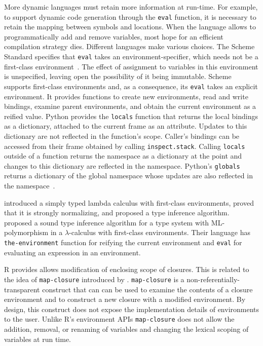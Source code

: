 \documentclass[10pt,review,sigplan,authorversion=true]{acmart}
\newcommand{\code}[1]{\lstinline |#1|\xspace}
\renewcommand{\c}[1]{\lstinline |#1|\xspace}
\begin{document}
More dynamic languages must retain more information at run-time. For example, to
support dynamic code generation through the \c{eval} function, it is necessary
to retain the mapping between symbols and locations. When the language allows to
programmatically add and remove variables, most hope for an efficient
compilation strategy dies. Different languages make various choices. The Scheme
Standard specifies that \code{eval} takes an environment-specifier, which needs
not be a first-class environment~\cite{SchemeR5RS}. The effect of assignment to
variables in this environment is unspecified, leaving open the possibility of it
being immutable. Scheme supports first-class environments and, as a consequence,
its \code{eval} takes an explicit environment. It provides functions to create
new environments, read and write bindings, examine parent environments, and
obtain the current environment as a reified value. Python provides the
\code{locals} function that returns the local bindings as a dictionary, attached
to the current frame as an attribute. Updates to this dictionary are not
reflected in the function's scope. Caller's bindings can be accessed from their
frame obtained by calling \code{inspect.stack}. Calling \code{locals} outside of
a function returns the namespace as a dictionary at the point and changes to
this dictionary are reflected in the namespace. Python's \code{globals} returns
a dictionary of the global namespace whose updates are also reflected in the
namespace~\cite{}.

\citet{NishizakiSTLC94} introduced a simply typed lambda calculus with
first-class environments, proved that it is strongly normalizing, and proposed a
type inference algorithm. \citet{NishizakiML94} proposed a sound type inference
algorithm for a type system with ML-polymorphism in a $\lambda$-calculus with
first-class environments. Their language has \c{the-environment} function for
reifying the current environment and \c{eval} for evaluating an expression in an
environment.

R provides allows modification of enclosing scope of closures. This is related
to the idea of \c{map-closure} introduced by \citet{Siskind07}. \c{map-closure}
is a non-referentially-transparent construct that can can be used to examine the
contents of a closure environment and to construct a new closure with a modified
environment. By design, this construct does not expose the implementation
details of environments to the user. Unlike R's environment APIs \c{map-closure}
does not allow the addition, removal, or renaming of variables and changing the
lexical scoping of variables at run time.
\end{document}
